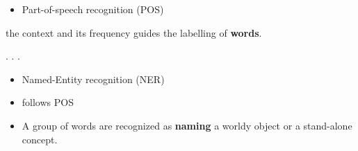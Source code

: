 \documentclass[
  letterpaper,
  DIV=11,
  numbers=noendperiod]{scrartcl}
\providecommand{\tightlist}{%
  \setlength{\itemsep}{0pt}\setlength{\parskip}{0pt}}\usepackage{longtable,booktabs,array}
\begin{document}
\begin{itemize}
\tightlist
\item
  Part-of-speech recognition (POS)
\end{itemize}

the context and its frequency guides the labelling of \textbf{words}.

. . .

\begin{itemize}
\item
  Named-Entity recognition (NER)
\item
  follows POS
\item
  A group of words are recognized as \textbf{naming} a worldy object or
  a stand-alone concept.
\end{itemize}
\end{document}
